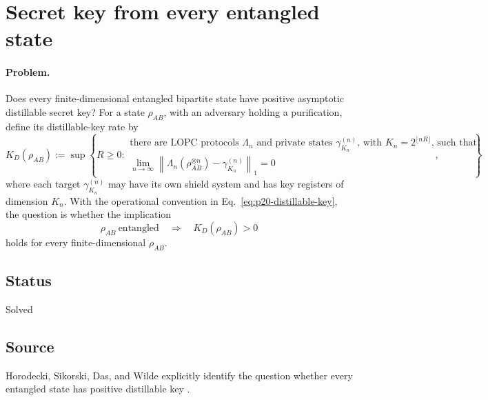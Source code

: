 \section{Secret key from every entangled state}
\label{sec:op_b952ec2dd8246a10}

\paragraph{Problem.}
Does every finite-dimensional entangled bipartite state have positive
asymptotic distillable secret key?  For a state $\rho_{AB}$, with an adversary
holding a purification, define its distillable-key rate by
\begin{equation}
  K_D(\rho_{AB})
  :=\sup\left\{R\geq0:
    \begin{array}{l}
      \text{there are LOPC protocols $\Lambda_n$ and private states
      $\gamma^{(n)}_{K_n}$, with $K_n=2^{\lfloor nR\rfloor}$, such that}\\[-1mm]
      \displaystyle
      \lim_{n\to\infty}
      \left\|\Lambda_n(\rho_{AB}^{\otimes n})
      -\gamma^{(n)}_{K_n}\right\|_1=0
    \end{array}
  \right\},
  \label{eq:p20-distillable-key}
\end{equation}
where each target $\gamma^{(n)}_{K_n}$ may have its own shield system and has
key registers of dimension $K_n$.  With the operational convention in
Eq.~\eqref{eq:p20-distillable-key},
the question is whether the implication
\begin{equation}
  \rho_{AB}\ \text{entangled}
  \quad\Longrightarrow\quad
  K_D(\rho_{AB})>0
  \label{eq:p20-entanglement-implies-key}
\end{equation}
holds for every finite-dimensional $\rho_{AB}$.

\subsection*{Status}

Solved

\subsection*{Source}

Horodecki, Sikorski, Das, and Wilde explicitly identify the question whether
every entangled state has positive distillable key
.

